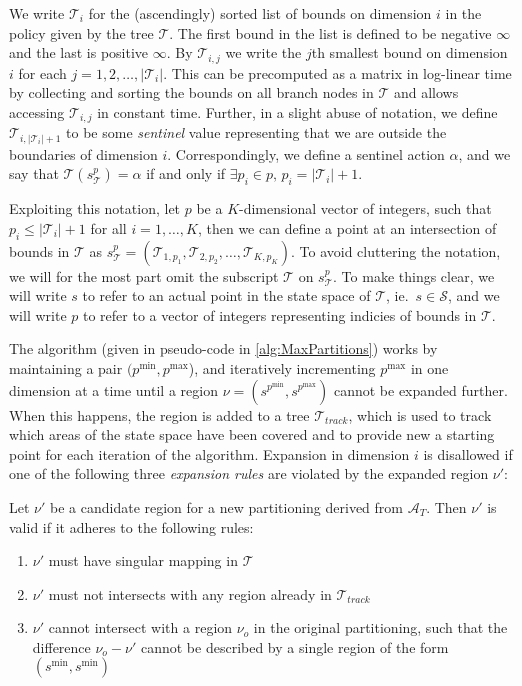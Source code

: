 We write $\mathcal{T}_i$ for the (ascendingly) sorted list of bounds on
dimension $i$ in the policy given by the tree $\mathcal{T}$. The first bound in
the list is defined to be negative $\infty$ and the last is positive $\infty$.
By $\mathcal{T}_{i,j}$ we write the $j$th smallest bound on dimension $i$ for
each $j = 1, 2, \ldots, |\mathcal{T}_i|$. This can be precomputed as a matrix in
log-linear time by collecting and sorting the bounds on all branch nodes in
$\mathcal{T}$ and allows accessing $\mathcal{T}_{i,j}$ in constant time.
Further, in a slight abuse of notation, we define $\mathcal{T}_{i,
|\mathcal{T}_i| + 1}$ to be some \textit{sentinel} value representing that we
are outside the boundaries of dimension $i$. Correspondingly, we define a
sentinel action $\alpha$, and we say that $\mathcal{T}(s^p_{\mathcal{T}}) =
\alpha$ if and only if $\exists p_i \in p,\, p_i = |\mathcal{T}_i| + 1$.

Exploiting this notation, let $p$ be a $K$-dimensional vector of integers, such
that $p_i \leq |\mathcal{T}_i| + 1$ for all $i = 1,\ldots,K$, then we can define
a point at an intersection of bounds in $\mathcal{T}$ as $s^{p}_{\mathcal{T}} =
(\mathcal{T}_{1,p_1}, \mathcal{T}_{2,p_2}, \ldots, \mathcal{T}_{K,p_K})$. To
avoid cluttering the notation, we will for the most part omit the subscript
$\mathcal{T}$ on $s^{p}_{\mathcal{T}}$. To make things clear, we will write $s$
to refer to an actual point in the state space of $\mathcal{T}$, ie.\ $s \in
\mathcal{S}$, and we will write $p$ to refer to a vector of integers
representing indicies of bounds in $\mathcal{T}$.

The algorithm (given in pseudo-code in \cref{alg:MaxPartitions}) works
by maintaining a pair $(p^{\min}, p^{\max}$), and iteratively incrementing
$p^{\max}$ in one dimension at a time until a region $\nu = (s^{p^{\min}},
s^{p^{\max}})$ cannot be expanded further. When this happens, the region is
added to a tree $\mathcal{T}_{track}$, which is used to track which areas of the
state space have been covered and to provide new a starting point for each
iteration of the algorithm. Expansion in dimension $i$ is disallowed if one of
the following three \textit{expansion rules} are violated by the expanded region
$\nu'$:

\begin{definition}\label{def:expansionRules}
    Let $\nu'$ be a candidate region for a new partitioning derived from
    $\mathcal{A}_{T}$. Then $\nu'$ is valid if it adheres to the following rules:

    \begin{enumerate}
        \item $\nu'$ must have singular mapping in $\mathcal{T}$
        \item $\nu'$ must not intersects with any region already in
            $\mathcal{T}_{track}$
        \item $\nu'$ cannot intersect with a region $\nu_{o}$ in the original
            partitioning, such that the difference $\nu_{o} - \nu'$ cannot be
            described by a single region of the form $(s^{\min}, s^{\min})$
    \end{enumerate}
\end{definition}


